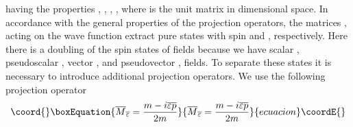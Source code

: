 \documentclass[a4paper,12pt]{article}
\begin{document}
having the properties \coordHE{}, \coordHE{}, \coordHE{}, \coordHE{}, where \coordHE{} is the unit matrix
in \coordHE{} dimensional space. In accordance with the general
properties of the projection operators, the matrices \coordHE{},
\coordHE{} acting on the wave function extract pure states with
spin \coordHE{} and \coordHE{}, respectively. Here there is a doubling of the
spin states of fields because we have scalar \coordHE{},
pseudoscalar \coordHE{}, vector \myHighlight{$\psi _\mu $}\coordHE{}, and
pseudovector \myHighlight{$\widetilde{\psi }_\mu $}\coordHE{}, fields. To separate these
states it is necessary to introduce additional projection
operators. We use the following projection operator
\begin{equation}\coord{}\boxEquation{
\overline{M}_{\overline{\varepsilon
}}=\frac{m-i\overline{\varepsilon } \overline{p}}{2m}  \label{32}
}{
\overline{M}_{\overline{\varepsilon
}}=\frac{m-i\overline{\varepsilon } \overline{p}}{2m}  }{ecuacion}\coordE{}\end{equation}
\end{document}
